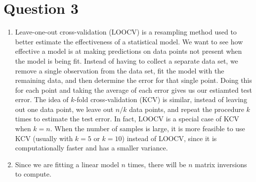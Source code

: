 \documentclass[10pt]{article}
\begin{document}
\section{Question 3} \noindent
\begin{enumerate}
    \item Leave-one-out cross-validation (LOOCV) is a resampling method used to better estimate the effectiveness of a statistical model. 
    We want to see how effective a model is at making predictions on data points not present when the model is being fit. Instead of having to 
    collect a separate data set, we remove a single observation from the data set, fit the model with the remaining data, and then determine the error for 
    that single point. Doing this for each point and taking the average of each error gives us our estiamted test error. 
    The idea of \(k\)-fold cross-validation (KCV) is similar, instead of leaving out one data point, we leave out \(n / k\) data points, and repeat the procedure
    \(k\) times to estimate the test error. In fact, LOOCV is a special case of KCV when \(k = n\). When the number of samples is large, it is more feasible to 
    use KCV (usually with \(k = 5\) or \(k = 10\)) instead of LOOCV, since it is computationally faster and has a smaller variance. 
    \item Since we are fitting a linear model \(n\) times, there will be \(n\) matrix inversions to compute.
\end{enumerate}

\newcommand{\rn}{N}
\end{document}
